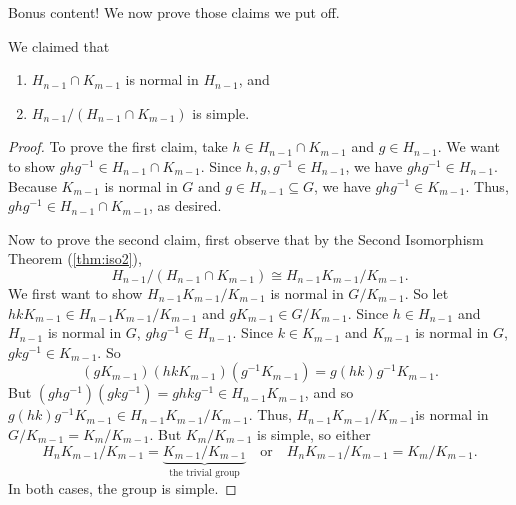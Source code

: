 Bonus content! We now prove those claims we put off.

We claimed that
\begin{enumerate}
	\item $H_{n-1}\cap K_{m-1}$ is normal in $H_{n-1}$, and
	\item $H_{n-1}/(H_{n-1}\cap K_{m-1})$ is simple.
\end{enumerate}

\begin{proof}
	To prove the first claim, take $h\in H_{n-1}\cap K_{m-1}$ and $g\in H_{n-1}$. We want to show $ghg^{-1}\in H_{n-1}\cap K_{m-1}$. Since $h,g,g^{-1}\in H_{n-1}$, we have $ghg^{-1}\in H_{n-1}$. Because $K_{m-1}$ is normal in $G$ and $g\in H_{n-1}\subseteq G$, we have $ghg^{-1}\in K_{m-1}$. Thus, $ghg^{-1}\in H_{n-1}\cap K_{m-1}$, as desired.

	Now to prove the second claim, first observe that by the Second Isomorphism Theorem (\ref{thm:iso2}),
	$$H_{n-1}/(H_{n-1}\cap K_{m-1})\cong H_{n-1}K_{m-1}/K_{m-1}.$$
	We first want to show $H_{n-1}K_{m-1}/K_{m-1}$ is normal in $G/K_{m-1}$. So let $hkK_{m-1}\in H_{n-1}K_{m-1}/K_{m-1}$ and $gK_{m-1}\in G/K_{m-1}$. Since $h\in H_{n-1}$ and $H_{n-1}$ is normal in $G$, $ghg^{-1}\in H_{n-1}$. Since $k\in K_{m-1}$ and $K_{m-1}$ is normal in $G$, $gkg^{-1}\in K_{m-1}$. So 
	$$(gK_{m-1})(hkK_{m-1})(g^{-1}K_{m-1})=g(hk)g^{-1}K_{m-1}.$$
	But $(ghg^{-1})(gkg^{-1})=ghkg^{-1}\in H_{n-1}K_{m-1}$, and so $g(hk)g^{-1}K_{m-1}\in H_{n-1}K_{m-1}/K_{m-1}$. Thus, $H_{n-1}K_{m-1}/K_{m-1}$is normal in $G/K_{m-1}=K_m/K_{m-1}$. But $K_m/K_{m-1}$ is simple, so either
	$$H_nK_{m-1}/K_{m-1}=\underbrace{K_{m-1}/K_{m-1}}_\text{the trivial group}\quad\text{or}\quad H_nK_{m-1}/K_{m-1}=K_m/K_{m-1}.$$
	In both cases, the group is simple.
\end{proof}